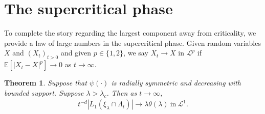 \documentclass[a4paper,12pt]{scrartcl}
\newtheorem{theorem}{Theorem}[section]
\theoremstyle{definition}
\theoremstyle{remark}
\begin{document}
  \section{The supercritical phase}
  \label{s:supercritical}
  To complete the story regarding the largest component away from criticality,
  we provide a law of large numbers in the supercritical phase.
  Given random variables $X$ and $(X_t)_{ t >0}$
  and given $p \in \{1,2\}$,
  we say $X_t \to X$ in
  $\mathcal L^p$ if $\mathbb E[|X_t -X|^p] \to 0$ as $ t \to \infty$.

  \begin{theorem}
    \label{th:super}
    Suppose that  $\psi(\cdot)$ is
    radially symmetric and decreasing with bounded
    support. Suppose $\lambda > \lambda_c$.
    Then as $t \to \infty$,
    \begin{align}
      \label{e:giant}
      t^{-d} |L_1(\xi_\lambda \cap \Lambda_t )|
      \to
      \lambda \theta(\lambda)
      ~ \mathrm{ in } ~ \mathcal L^1.
    \end{align}
  \end{theorem}
\end{document}
